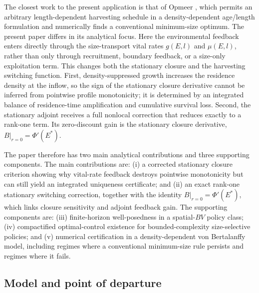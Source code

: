\documentclass[pdflatex,sn-mathphys-num]{sn-jnl}
\theoremstyle{plain}
\theoremstyle{definition}
\theoremstyle{remark}
\begin{document}
The closest work to the present application is that of Opmeer
\cite{opmeer2025optimal}, which permits an arbitrary length-dependent harvesting schedule
in a density-dependent age/length formulation and numerically finds a conventional
minimum-size optimum. The present paper differs in its analytical focus. Here the
environmental feedback enters directly through the size-transport vital rates
$g(E,l)$ and $\mu(E,l)$, rather than only through recruitment, boundary feedback,
or a size-only exploitation term. This changes both the stationary closure and
the harvesting switching function. First, density-suppressed growth increases the
residence density at the inflow, so the sign of the stationary closure derivative
cannot be inferred from pointwise profile monotonicity; it is determined by an
integrated balance of residence-time amplification and cumulative survival loss.
Second, the stationary adjoint receives a full nonlocal correction that reduces
exactly to a rank-one term. Its zero-discount gain is the stationary closure
derivative,
$\displaystyle B|_{r=0}=\Phi'(E^*)$.

The paper therefore has two main analytical contributions and three supporting
components. The main contributions are: (i) a corrected stationary closure
criterion showing why vital-rate feedback destroys pointwise monotonicity but can
still yield an integrated uniqueness certificate; and (ii) an exact rank-one
stationary switching correction, together with the identity
$B|_{r=0}=\Phi'(E^*)$, which links closure sensitivity and adjoint feedback gain.
The supporting components are: (iii) finite-horizon well-posedness in a
spatial-$BV$ policy class; (iv) compactified optimal-control existence for
bounded-complexity size-selective policies; and (v) numerical certification in a
density-dependent von Bertalanffy model, including regimes where a conventional
minimum-size rule persists and regimes where it fails.

\subsection{Model and point of departure}
\label{subsec:point_departure}
\end{document}
